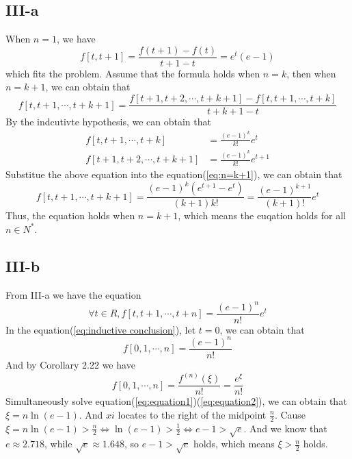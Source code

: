 \documentclass[a4paper]{article}
\begin{document}
\subsection*{III-a}
When $n=1$, we have
\begin{equation}
  f[t,t+1]=\frac{f(t+1)-f(t)}{t+1-t}=e^t(e-1)
\end{equation}
which fits the problem.
Assume that the formula holds when $n=k$, then when $n=k+1$, we can obtain that
\begin{equation}
  f[t,t+1,\cdots,t+k+1]=\frac{f[t+1,t+2,\cdots,t+k+1]-f[t,t+1,\cdots,t+k]}{t+k+1-t} \label{eq:n=k+1}
\end{equation}
By the indcutivte hypothesis, we can obtain that
\begin{align}
  f[t,t+1,\cdots,t+k]&=\frac{(e-1)^k}{k!}e^t \\
  f[t+1,t+2,\cdots,t+k+1] &= \frac{(e-1)^k}{k!}e^{t+1}
\end{align}
Substitue the above equation into the equation(\ref{eq:n=k+1}), we can obtain that
\begin{equation}
  f[t,t+1,\cdots,t+k+1]=\frac{(e-1)^k(e^{t+1}-e^{t})}{(k+1)k!}=\frac{(e-1)^{k+1}}{(k+1)!}e^t
\end{equation}
Thus, the equation holds when $n=k+1$, which means the euqation holds for all $n\in N^{*}$.
\subsection*{III-b}
From III-a we have the equation
\begin{equation}
  \forall t\in R, f[t,t+1,\cdots,t+n]=\frac{(e-1)^n}{n!}e^t \label{eq:inductive conclusion}
\end{equation}
In the equation(\ref{eq:inductive conclusion}), let $t=0$, we can obtain that 
\begin{equation}
  f[0,1,\cdots,n]=\frac{(e-1)^n}{n!} \label{eq:equation1}
\end{equation}
And by Corollary 2.22 we have
\begin{equation}
  f[0,1,\cdots,n]=\frac{f^{(n)}(\xi)}{n!}=\frac{e^{\xi}}{n!} \label{eq:equation2}
\end{equation}
Simultaneously solve equation(\ref{eq:equation1})(\ref{eq:equation2}), we can obtain that $\xi=n\ln(e-1)$. And $xi$ locates to the right of the midpoint $\frac{n}{2}$.
Cause $\xi=n\ln(e-1)>\frac{n}{2}\iff \ln(e-1) > \frac{1}{2} \iff e-1>\sqrt{e}$. And we know that $e\approx 2.718$, while $\sqrt{e}\approx 1.648$, so $e-1>\sqrt{e}$ holds, which means
$\xi > \frac{n}{2}$ holds.  
\end{document}
